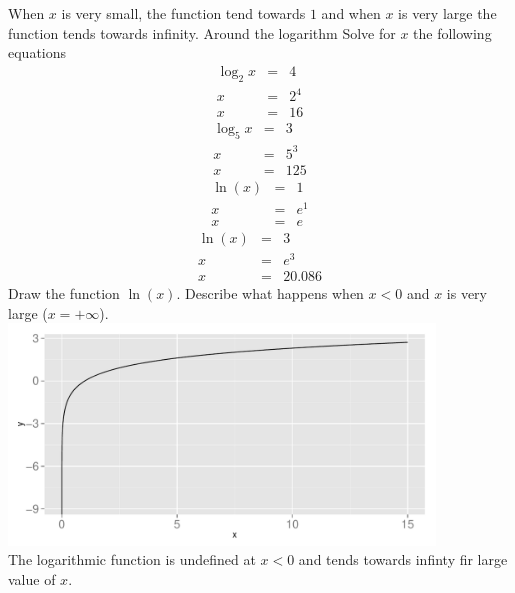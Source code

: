 \documentclass[a4paper]{report}
\begin{document}
\begin{Answer}[ref=exexln]
When $x$ is very small, the function tend towards $1$ and when $x$ is very large the function tends towards infinity.
\Question Around the logarithm
\subQuestion Solve for $x$ the following equations
\begin{eqnarray*}
\log_2{x} &= &4\\
x&=&2^4\\
x&=&16
\end{eqnarray*}
\begin{eqnarray*}
\log_5{x} &= &3\\
x&=&5^3\\
x&=&125
\end{eqnarray*}
\begin{eqnarray*}
\ln(x) &= &1\\
x&=&e^1\\
x&=&e
\end{eqnarray*}
\begin{eqnarray*}
\ln(x) &= &3\\
x&=&e^3\\
x&=&20.086
\end{eqnarray*}
\subQuestion Draw the function $\ln(x)$. Describe what happens when $x<0$ and $x$ is very large ($x=+\infty$).\\
\includegraphics[width=0.85\textwidth]{ln_plot.pdf}\\
The logarithmic function is undefined at $x<0$ and tends towards infinty fir large value of $x$.


\end{Answer}
\end{document}
